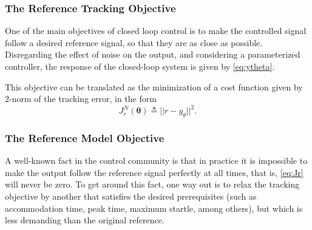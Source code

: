 \subsubsection{The Reference Tracking Objective}%
\label{sub:the_reference_tracking_objective}
One of the main objectives of closed loop control is to make the controlled signal follow a desired reference signal, so that they are as close as possible. Disregarding the effect of noise on the output, and considering a parameterized controller, the response of the closed-loop system is given by \eqref{eq:ytheta}.

This objective can be translated as the minimization of a cost function given by 2-norm of the tracking error, in the form
\begin{equation}
   J_r^N(\bm{\theta}) \triangleq || r - y_\theta ||^2 .
   \label{eq:Jr}
\end{equation}

\subsubsection{The Reference Model Objective}%
\label{sub:The Reference Model Objective}

A well-known fact in the control community is that in practice it is impossible to make the output follow the reference signal perfectly at all times, that is, \eqref{eq:Jr} will never be zero.
To get around this fact, one way out is to relax the tracking objective by another that satisfies the desired prerequisites (such as accommodation time, peak time, maximum startle, among others), but which is less demanding than the original reference.

